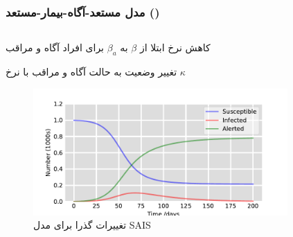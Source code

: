 \documentclass[xcolor=dvipsnames, professionalfonts, aspectratio=169, 11pt]{beamer}
\begin{document}
\begin{frame}
    \frametitle{مدل مستعد-آگاه-بیمار-مستعد ()}

    \begin{columns}[onlytextwidth]
        \begin{column}{.5\textwidth}
            \begin{moredi}
                \item کاهش نرخ ابتلا از $\beta$ به $\beta_a$ برای افراد آگاه و مراقب
                \item تغییر وضعیت به حالت آگاه و مراقب با نرخ $\kappa$
            \end{moredi}
            \begin{figure}[ht]
                \centering
                \includegraphics[width=\textwidth]{./img/sais-transition.pdf}
                \caption{تغییرات گذرا برای مدل SAIS}
                \label{fig:sais-transition}
            \end{figure}
        \end{column}
        \begin{column}{.5\textwidth}
            \begin{figure}[ht]
                \centering
\end{figure}
\end{column}
\end{columns}
\end{frame}
\end{document}
